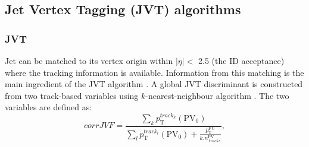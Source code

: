 \subsection{Jet Vertex Tagging (JVT) algorithms}
\label{Jet:Tag:JVT}

\subsubsection{JVT}
\label{Jet:Tag:JVT:JVT}
Jet can be matched to its vertex origin within $|\eta|<$ 2.5 (the ID acceptance) where the tracking information is available. Information from this matching is the main ingredient of the JVT algorithm \cite{JVT_Perf}. A global JVT discriminant is constructed from two track-based variables using $k$-nearest-neighbour algorithm \cite{kNN}. The two variables are defined as: 
\begin{equation}
    corrJVF=\frac{\sum_{k} p_{\mathrm{T}}^{ {track
    }_{k}}\left(\mathrm{PV}_{0}\right)}{\sum_{l} p_{\mathrm{T}}^{{track
    }_{l}}\left(\mathrm{PV}_{0}\right)+\frac{p_{\mathrm{T}}^{\mathrm{PU}}}{k . n_{\ {tracks }}^{\mathrm{PV}}}},
\end{equation}

